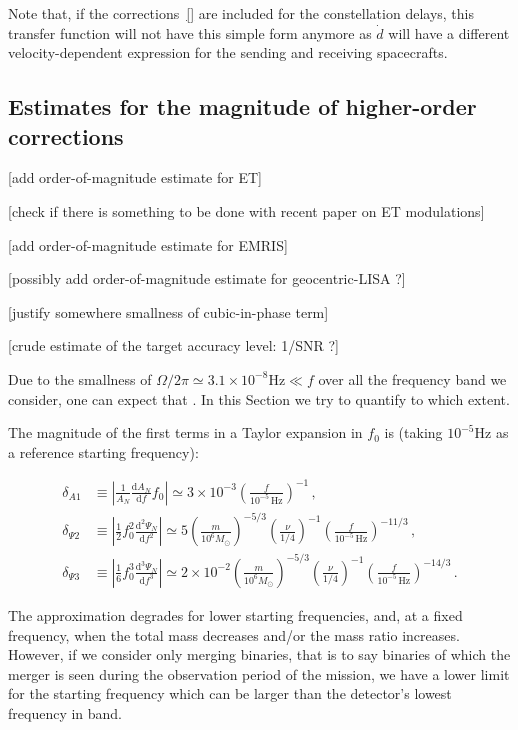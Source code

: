 \documentclass[aps,showpacs,twocolumn,
prd,superscriptaddress,nofootinbib]{revtex4-1}
\newcommand\ud{{\mathrm{d}}}
\newcommand{\Hz}{\,\mathrm{Hz}}
\newcommand{\Msol}{M_{\odot}}
\newcommand{\SM}[1]{{\color{Red} #1}}
\begin{document}
Note that, if the corrections~\eqref{} are included for the constellation delays, this transfer function will not have this simple form anymore as $\dot{d}$ will have a different velocity-dependent expression for the sending and receiving spacecrafts.


\subsection{Estimates for the magnitude of higher-order corrections}
\label{subsec:sizecorrLISA}

\SM{[add order-of-magnitude estimate for ET]}

\SM{[check if there is something to be done with recent paper on ET modulations]}

\SM{[add order-of-magnitude estimate for EMRIS]}

\SM{[possibly add order-of-magnitude estimate for geocentric-LISA ?]}

\SM{[justify somewhere smallness of cubic-in-phase term]}

\SM{[crude estimate of the target accuracy level: 1/SNR ?]}

Due to the smallness of $\Omega/2\pi \simeq 3.1\times10^{-8}\mathrm{Hz} \ll f$ over all the frequency band we consider, one can expect that . In this Section we try to quantify to which extent. 

The magnitude of the first terms in a Taylor expansion in $f_{0}$ is (taking $10^{-5}\mathrm{Hz}$ as a reference starting frequency):
%
\begin{widetext}
\begin{subequations}
\begin{align}
	\delta_{A1} &\equiv \left| \frac{1}{A_{N}}\frac{\ud A_{N}}{\ud f} f_0 \right| \simeq 3\times10^{-3} \left(\frac{f}{10^{-5}\Hz}\right)^{-1} \,,\\
	\delta_{\Psi 2} &\equiv \left| \frac{1}{2} f_0^{2}\frac{\ud^{2} \Psi_{N}}{\ud f^{2}} \right| \simeq 5 \left( \frac{m}{10^{6}\Msol} \right)^{-5/3} \left( \frac{\nu}{1/4} \right)^{-1} \left( \frac{f}{10^{-5}\Hz} \right)^{-11/3} \,, \\
	\delta_{\Psi 3} &\equiv \left| \frac{1}{6} f_0^{3}\frac{\ud^{3} \Psi_{N}}{\ud f^{3}} \right| \simeq 2\times 10^{-2} \left( \frac{m}{10^{6}\Msol} \right)^{-5/3} \left( \frac{\nu}{1/4} \right)^{-1} \left( \frac{f}{10^{-5}\Hz} \right)^{-14/3} \,.
\end{align}
\end{subequations}
\end{widetext}
%
The approximation degrades for lower starting frequencies, and, at a fixed frequency, when the total mass decreases and/or the mass ratio increases. However, if we consider only merging binaries, that is to say binaries of which the merger is seen during the observation period of the mission, we have a lower limit for the starting frequency which can be larger than the detector's lowest frequency in band.
\end{document}
